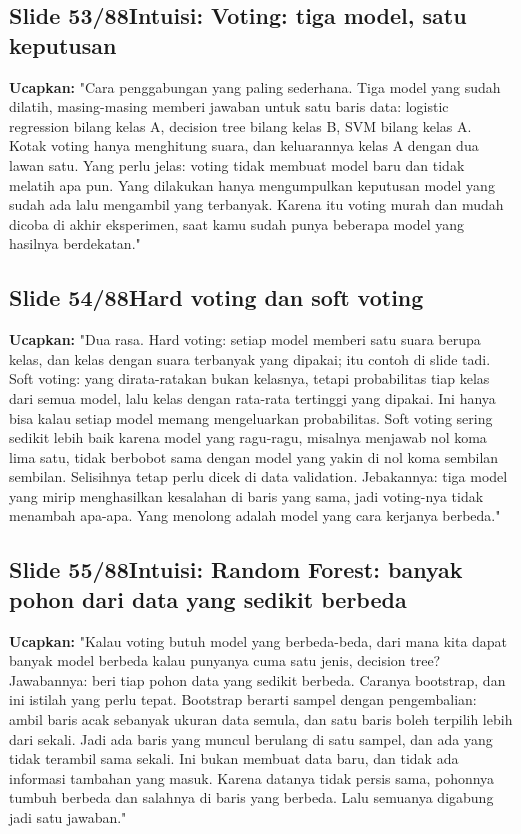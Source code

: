 \documentclass[11pt]{article}
\renewcommand{\framebox}[1]{\colorbox{acc!15}{\textcolor{acc}{\textbf{#1}}}}
\begin{document}
\subsection*{\framebox{Slide 53/88}\quad Intuisi: Voting: tiga model, satu keputusan}
\textbf{Ucapkan:} "Cara penggabungan yang paling sederhana. Tiga model yang sudah dilatih, masing-masing memberi jawaban untuk satu baris data: logistic regression bilang kelas A, decision tree bilang kelas B, SVM bilang kelas A. Kotak voting hanya menghitung suara, dan keluarannya kelas A dengan dua lawan satu. Yang perlu jelas: voting tidak membuat model baru dan tidak melatih apa pun. Yang dilakukan hanya mengumpulkan keputusan model yang sudah ada lalu mengambil yang terbanyak. Karena itu voting murah dan mudah dicoba di akhir eksperimen, saat kamu sudah punya beberapa model yang hasilnya berdekatan."\\[2pt]

\subsection*{\framebox{Slide 54/88}\quad Hard voting dan soft voting}
\textbf{Ucapkan:} "Dua rasa. Hard voting: setiap model memberi satu suara berupa kelas, dan kelas dengan suara terbanyak yang dipakai; itu contoh di slide tadi. Soft voting: yang dirata-ratakan bukan kelasnya, tetapi probabilitas tiap kelas dari semua model, lalu kelas dengan rata-rata tertinggi yang dipakai. Ini hanya bisa kalau setiap model memang mengeluarkan probabilitas. Soft voting sering sedikit lebih baik karena model yang ragu-ragu, misalnya menjawab nol koma lima satu, tidak berbobot sama dengan model yang yakin di nol koma sembilan sembilan. Selisihnya tetap perlu dicek di data validation. Jebakannya: tiga model yang mirip menghasilkan kesalahan di baris yang sama, jadi voting-nya tidak menambah apa-apa. Yang menolong adalah model yang cara kerjanya berbeda."\\[2pt]

\subsection*{\framebox{Slide 55/88}\quad Intuisi: Random Forest: banyak pohon dari data yang sedikit berbeda}
\textbf{Ucapkan:} "Kalau voting butuh model yang berbeda-beda, dari mana kita dapat banyak model berbeda kalau punyanya cuma satu jenis, decision tree? Jawabannya: beri tiap pohon data yang sedikit berbeda. Caranya bootstrap, dan ini istilah yang perlu tepat. Bootstrap berarti sampel dengan pengembalian: ambil baris acak sebanyak ukuran data semula, dan satu baris boleh terpilih lebih dari sekali. Jadi ada baris yang muncul berulang di satu sampel, dan ada yang tidak terambil sama sekali. Ini bukan membuat data baru, dan tidak ada informasi tambahan yang masuk. Karena datanya tidak persis sama, pohonnya tumbuh berbeda dan salahnya di baris yang berbeda. Lalu semuanya digabung jadi satu jawaban."\\[2pt]
\end{document}
